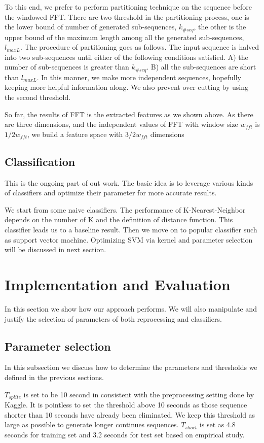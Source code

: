 \documentclass{article} %
\begin{document}
To this end, we prefer to perform partitioning technique on the sequence before the windowed FFT. There are two threshold in the partitioning process, one is the lower bound of number of generated sub-sequences, $k_{\#seq}$, the other is the upper bound of the maximum length among all the generated sub-sequences, $l_{maxL}$. The procedure of partitioning goes as follows. The input sequence is halved into two sub-sequences until either of the following conditions satisfied. A) the number of sub-sequences is greater than $k_{\#seq}$. B) all the sub-sequences are short than $l_{maxL}$. In this manner, we make more independent sequences, hopefully keeping more helpful information along. We also prevent over cutting by using the second threshold.

So far, the results of FFT is the extracted features as we shown above. As there are three dimensions, and the independent values of FFT with window size $w_{fft}$ is $1/2w_{fft}$, we build a feature space with $3/2w_{fft}$ dimensions

\subsection{Classification}
This is the ongoing part of out work. The basic idea is to leverage various kinds of classifiers and optimize their parameter for more accurate results.

We start from some naive classifiers. The performance of K-Nearest-Neighbor depends on the number of K and the definition of distance function. This classifier leads us to a baseline result. Then we move on to popular classifier such as support vector machine. Optimizing SVM via kernel and parameter selection will be discussed in next section.

\section{Implementation and Evaluation}
In this section we show how our approach performs. We will also manipulate and justify the selection of parameters of both reprocessing and classifiers.

\subsection{Parameter selection}
In this subsection we discuss how to determine the parameters and thresholds we defined in the previous sections.

$T_{splite}$ is set to be 10 second in consistent with the preprocessing setting done by Kaggle. It is pointless to set the threshold above 10 seconds as those sequence shorter than 10 seconds have already been eliminated. We keep this threshold as large as possible to generate longer continues sequences. $T_{short}$ is set as 4.8 seconds for training set and 3.2 seconds for test set based on empirical study. 
\end{document}
